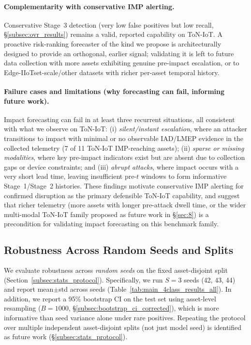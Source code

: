 \documentclass[pdflatex,sn-mathphys-num]{sn-jnl}
\theoremstyle{thmstyleone}%
\theoremstyle{thmstyletwo}%
\theoremstyle{thmstylethree}%
\begin{document}
\paragraph{Complementarity with conservative IMP alerting.}
Conservative Stage~3 detection (very low false positives but low recall, \S\ref{subsec:ovr_results}) remains a valid, reported capability on ToN-IoT. A proactive risk-ranking forecaster of the kind we propose is architecturally designed to provide an orthogonal, earlier signal; validating it is left to future data collection with more assets exhibiting genuine pre-impact escalation, or to Edge-IIoTset-scale/other datasets with richer per-asset temporal history.

\paragraph{Failure cases and limitations (why forecasting can fail, informing future work).}
Impact forecasting can fail in at least three recurrent situations, all consistent with what we observe on ToN-IoT: (i) \emph{silent/instant escalation}, where an attacker transitions to impact with minimal or no observable IAD/LMEP evidence in the collected telemetry (7 of 11 ToN-IoT IMP-reaching assets); (ii) \emph{sparse or missing modalities}, where key pre-impact indicators exist but are absent due to collection gaps or device constraints; and (iii) \emph{abrupt attacks}, where impact occurs with a very short lead time, leaving insufficient pre-$t$ windows to form informative Stage~1/Stage~2 histories. These findings motivate conservative IMP alerting for confirmed disruption as the primary defensible ToN-IoT capability, and suggest that richer telemetry (more assets with longer pre-attack dwell time, or the wider multi-modal ToN-IoT family proposed as future work in \S\ref{sec:8}) is a precondition for validating impact forecasting on this benchmark family.


\subsection{Robustness Across Random Seeds and Splits}
\label{subsec:seed_robustness}

We evaluate robustness across \emph{random seeds} on the fixed asset-disjoint split (Section~\ref{subsec:stats_protocol}).
Specifically, we run $S{=}3$ seeds (42, 43, 44) and report mean$\pm$std across seeds (Table~\ref{tab:main_4class_results_all}).
In addition, we report a 95\% bootstrap CI on the test set using asset-level resampling ($B{=}1000$, \S\ref{subsec:bootstrap_ci_corrected}), which is more informative than seed variance alone under rare positives. Repeating the protocol over multiple independent asset-disjoint splits (not just model seed) is identified as future work (\S\ref{subsec:stats_protocol}).
\end{document}
